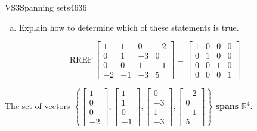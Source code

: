 \begin{exercise}{VS3}{Spanning sets}{4636}
\begin{exerciseStatement}
\begin{enumerate}[(a)]
\begin{itemize}
 
\end{itemize}

     
\item  

 Explain how to determine which of these statements is true. 

 
\end{enumerate}

     \end{exerciseStatement}
 \begin{exerciseAnswer} 

 \[
\mathrm{RREF}\, \left[\begin{array}{cccc}
1 & 1 & 0 & -2 \\
0 & 1 & -3 & 0 \\
0 & 0 & 1 & -1 \\
-2 & -1 & -3 & 5
\end{array}\right] = \left[\begin{array}{cccc}
1 & 0 & 0 & 0 \\
0 & 1 & 0 & 0 \\
0 & 0 & 1 & 0 \\
0 & 0 & 0 & 1
\end{array}\right]
            \] 

 

 The set of vectors \(\left\{ \left[\begin{array}{c}
1 \\
0 \\
0 \\
-2
\end{array}\right] , \left[\begin{array}{c}
1 \\
1 \\
0 \\
-1
\end{array}\right] , \left[\begin{array}{c}
0 \\
-3 \\
1 \\
-3
\end{array}\right] , \left[\begin{array}{c}
-2 \\
0 \\
-1 \\
5
\end{array}\right] \right\}\) \textbf{spans} \(\mathbb{R}^4\). 

 \end{exerciseAnswer}
 \end{exercise}


